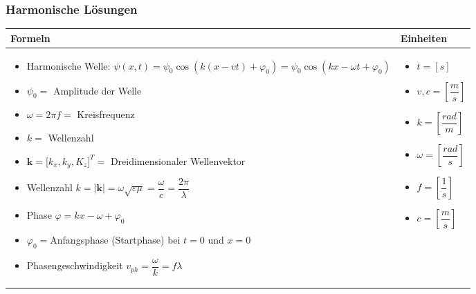 \subsubsection{Harmonische Lösungen}
\begin{tabular}{ | m{15cm} | m{3cm}  | }
	\hline
	Formeln & Einheiten  \\ \hline
	\hline
	\begin{itemize}
		\item[] Harmonische Welle: $\psi(x,t)=\psi_0\cos(k(x-vt)+\varphi_0)=\psi_0\cos(kx-\omega t+\varphi_0)$
		\item[] $\psi_0=$ Amplitude der Welle
		\item[] $\omega=2\pi f=$ Kreisfrequenz
		\item[] $k=$ Wellenzahl
		\item[] $\mathbf{k}=\big[k_x,k_y,K_z\big]^T=$ Dreidimensionaler Wellenvektor
		\item[] Wellenzahl $k=\big|\mathbf{k}\big|=\omega \sqrt{\varepsilon \mu}=\dfrac{\omega}{c}=\dfrac{2\pi}{\lambda}$
		\item[] Phase $\varphi = kx-\omega+\varphi_0$
		\item[] $\varphi_0= $Anfangsphase (Startphase) bei $t=0$ und $x=0$ 
		\item[] Phasengeschwindigkeit $v_{ph}=\dfrac{\omega}{k}=f\lambda$
	\end{itemize}   
	&
	\begin{itemize}
		\item[] $t=[s]$
		\item[] $v,c=[\dfrac{m}{s}]$
		\item[] $k=[\dfrac{rad}{m}]$
		\item[] $\omega=[\dfrac{rad}{s}]$
		\item[] $f=[\dfrac{1}{s}]$
		\item[] $c=[\dfrac{m}{s}]$
	\end{itemize} 	
	\\ \hline
\end{tabular}

